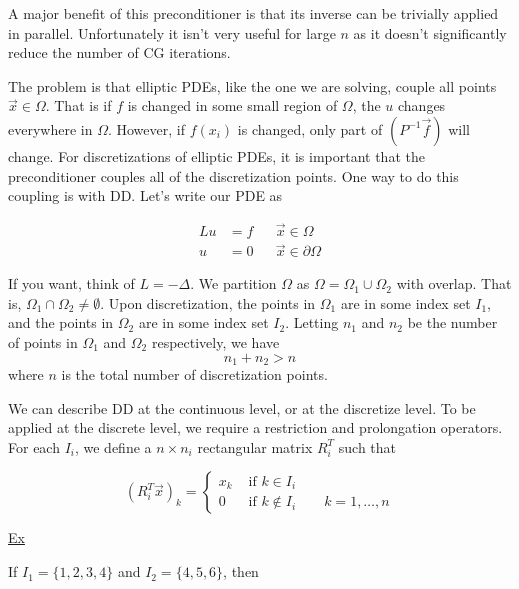 A major benefit of this preconditioner is that its inverse can be trivially applied in parallel. Unfortunately it isn't very useful for large $n$ as it doesn't significantly reduce the number of CG iterations.

The problem is that elliptic PDEs, like the one we are solving, couple all points $\vec{x}\in\Omega$. That is if $f$ is changed in some small region of $\Omega$, the $u$ changes everywhere in $\Omega$. However, if $f(x_i)$ is changed, only part of $\left(P^{-1}\vec{f}\right)$ will change. For discretizations of elliptic PDEs, it is important that the preconditioner couples all of the discretization points. One way to do this coupling is with DD. Let's write our PDE as

\begin{align*}
    Lu &=f &&\vec{x} \in \Omega \\
    u &= 0 &&\vec{x}\in \partial \Omega
\end{align*}

If you want, think of $L=-\Delta$. We partition $\Omega$ as $\Omega=\Omega_1 \cup \Omega_2$ with overlap. That is, $\Omega_1 \cap \Omega_2 \neq \emptyset$. Upon discretization, the points in $\Omega_1$ are in some index set $I_1$, and the points in $\Omega_2$ are in some index set $I_2$. Letting $n_1$ and $n_2$ be the number of points in $\Omega_1$ and $\Omega_2$ respectively, we have
\begin{equation*}
    n_1 + n_2 > n
\end{equation*}
where $n$ is the total number of discretization points.



We can describe DD at the continuous level, or at the discretize level. To be applied at the discrete level, we require a restriction and prolongation operators. For each $I_i$, we define a $n \times n_i$ rectangular matrix $R_i^T$ such that

\begin{equation*}
    (R_i^T \vec{x})_k = \begin{cases}
        x_k & \text{ if } k\in I_i\\
        0 & \text{ if } k \notin I_i \qquad k=1, \ldots, n
\end{cases}
\end{equation*}

\underline{Ex}

If $I_1=\{ 1, 2, 3, 4 \}$ and  $I_2 = \{ 4, 5, 6 \}$, then

